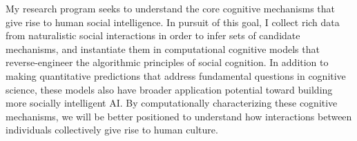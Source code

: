 \documentclass[11pt]{article}
\begin{document}
My research program seeks to understand the core cognitive mechanisms that give rise to human social intelligence.
In pursuit of this goal, I collect rich data from naturalistic social interactions in order to infer sets of candidate mechanisms, and instantiate them in computational cognitive models that reverse-engineer the algorithmic principles of social cognition. 
In addition to making quantitative predictions that address fundamental questions in cognitive science, these models also have broader application potential toward building more socially intelligent AI.
By computationally characterizing these cognitive mechanisms, we will be better positioned to understand how interactions between individuals collectively give rise to human culture. 




\small
\singlespacing


\end{document}
